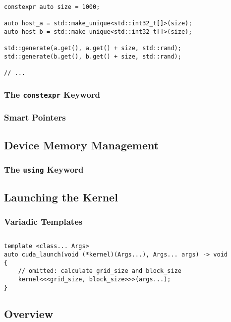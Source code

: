 \begin{lstlisting}
constexpr auto size = 1000;

auto host_a = std::make_unique<std::int32_t[]>(size);
auto host_b = std::make_unique<std::int32_t[]>(size);

std::generate(a.get(), a.get() + size, std::rand);
std::generate(b.get(), b.get() + size, std::rand);

// ...
\end{lstlisting}

\subsubsection{The \texttt{constexpr} Keyword}
\subsubsection{Smart Pointers}


\subsection{Device Memory Management}

\subsubsection{The \texttt{using} Keyword}

\subsection{Launching the Kernel}

\subsubsection{Variadic Templates}

\begin{lstlisting}

\end{lstlisting}

\begin{lstlisting}
template <class... Args>
auto cuda_launch(void (*kernel)(Args...), Args... args) -> void
{
    // omitted: calculate grid_size and block_size
    kernel<<<grid_size, block_size>>>(args...);
}
\end{lstlisting}

\subsection{Overview}

